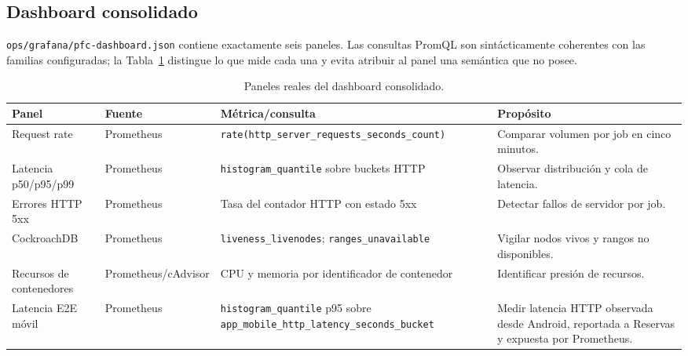 \subsection{Dashboard consolidado}
\label{subsec:dashboard-grafana}

\texttt{ops/grafana/pfc-dashboard.json} contiene exactamente seis paneles. Las
consultas PromQL son sintácticamente coherentes con las familias configuradas;
la Tabla~\ref{tab:paneles-grafana} distingue lo que mide cada una y evita
atribuir al panel una semántica que no posee.

\begin{table}[ht]
  \centering
  \small
  \caption{Paneles reales del dashboard consolidado.}
  \label{tab:paneles-grafana}
  \begin{tabular}{|p{3.0cm}|p{2.0cm}|p{3.6cm}|p{3.8cm}|}
    \hline
    \textbf{Panel} & \textbf{Fuente} & \textbf{Métrica/consulta} & \textbf{Propósito} \\
    \hline
    Request rate & Prometheus & \texttt{rate(http\_server\_requests\_seconds\_count)} & Comparar volumen por job en cinco minutos. \\
    \hline
    Latencia p50/p95/p99 & Prometheus & \texttt{histogram\_quantile} sobre buckets HTTP & Observar distribución y cola de latencia. \\
    \hline
    Errores HTTP 5xx & Prometheus & Tasa del contador HTTP con estado 5xx & Detectar fallos de servidor por job. \\
    \hline
    CockroachDB & Prometheus & \texttt{liveness\_livenodes}; \texttt{ranges\_unavailable} & Vigilar nodos vivos y rangos no disponibles. \\
    \hline
    Recursos de contenedores & Prometheus/cAdvisor & CPU y memoria por identificador de contenedor & Identificar presión de recursos. \\
    \hline
    Latencia E2E móvil & Prometheus & \texttt{histogram\_quantile} p95 sobre \texttt{app\_mobile\_http\_latency\_seconds\_bucket} & Medir latencia HTTP observada desde Android, reportada a Reservas y expuesta por Prometheus. \\
    \hline
  \end{tabular}
\end{table}

